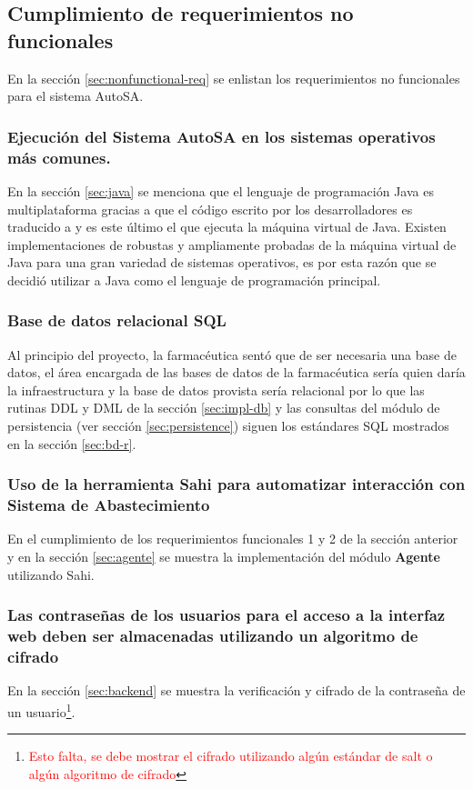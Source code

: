 \subsection{Cumplimiento de requerimientos no funcionales}
En la sección \ref{sec:nonfunctional-req} se enlistan los requerimientos no funcionales para el sistema AutoSA.

\subsubsection{Ejecución del Sistema AutoSA en los sistemas operativos más comunes.}
En la sección \ref{sec:java} se menciona que el lenguaje de programación Java es multiplataforma gracias a que el código escrito por los desarrolladores es traducido a  y es este último el que ejecuta la máquina virtual de Java. Existen implementaciones de robustas y ampliamente probadas de la máquina virtual de Java para una gran variedad de sistemas operativos, es por esta razón que se decidió utilizar a Java como el lenguaje de programación principal.

\subsubsection{Base de datos relacional SQL}
Al principio del proyecto, la farmacéutica sentó que de ser necesaria una base de datos, el área encargada de las bases de datos de la farmacéutica sería quien daría la infraestructura y la base de datos provista sería relacional por lo que las rutinas DDL y DML de la sección \ref{sec:impl-db} y las consultas del módulo de persistencia (ver sección \ref{sec:persistence}) siguen los estándares SQL mostrados en la sección \ref{sec:bd-r}.

\subsubsection{Uso de la herramienta Sahi para automatizar interacción con Sistema de Abastecimiento}
En el cumplimiento de los requerimientos funcionales 1 y 2 de la sección anterior y en la sección \ref{sec:agente} se muestra la implementación del módulo \textbf{Agente} utilizando Sahi.

\subsubsection{Las contraseñas de los usuarios para el acceso a la interfaz web deben ser almacenadas utilizando un algoritmo de cifrado}
En la sección \ref{sec:backend} se muestra la verificación y cifrado de la contraseña de un usuario\footnote{\textcolor{red}{Esto falta, se debe mostrar el cifrado utilizando algún estándar de salt o algún algoritmo de cifrado}}.



